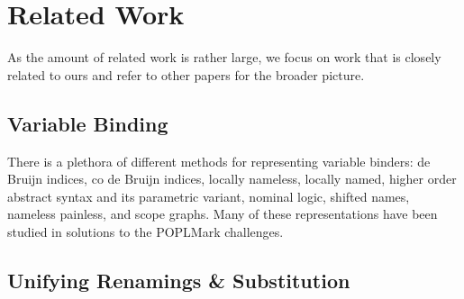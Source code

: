 \documentclass[a4paper, UKenglish, cleveref, autoref, thm-restate]{lipics-v2021}
\begin{document}
  \section{Related Work}
  \label{sec:related}




  As the amount of related work is rather large, we focus on work that
  is closely related to ours and refer to other papers for the
  broader
  picture\cite{DBLP:conf/cpp/StarkSK19,DBLP:journals/pacmpl/AllaisA0MM18}.

  \subsection{Variable Binding}
  There is a plethora of different methods for representing
  variable binders:
  de Bruijn indices\cite{scholar:de1972lambda},
  co de Bruijn indices\cite{DBLP:journals/corr/abs-1807-04085},
  locally nameless\cite{DBLP:journals/jar/Chargueraud12},
  locally named\cite{DBLP:conf/tlca/McKinnaP93},
  higher order abstract syntax\cite{DBLP:conf/pldi/PfenningE88} and
  its parametric variant\cite{DBLP:conf/icfp/Chlipala08},
  nominal logic\cite{DBLP:journals/tcs/UrbanPG04},
  shifted names\cite{scholar:dolansyntax},
  nameless painless\cite{DBLP:conf/icfp/Pouillard11}, and
  scope graphs\cite{DBLP:journals/pacmpl/AntwerpenPRV18}.
  Many of these representations have been studied in solutions to the POPLMark
  challenges\cite{DBLP:conf/tphol/AydemirBFFPSVWWZ05, DBLP:journals/jfp/AbelAHPMSS19}.

  \subsection{Unifying Renamings \& Substitution}
\end{document}
